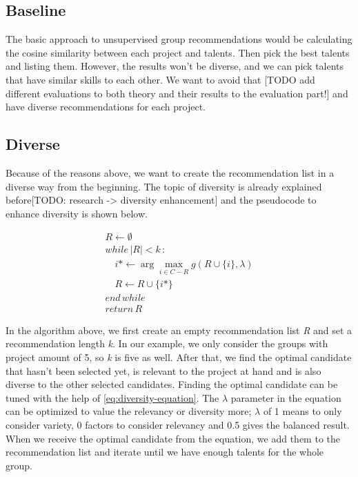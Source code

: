\subsection{Baseline}

The basic approach to unsupervised group recommendations would be calculating the cosine similarity between each project and talents. Then pick the best talents and listing them. However, the results won't be diverse, and we can pick talents that have similar skills to each other. We want to avoid that [TODO add different evaluations to both theory and their results to the evaluation part!] and have diverse recommendations for each project.


\subsection{Diverse}\label{implementation-diverse}

Because of the reasons above, we want to create the recommendation list in a diverse way from the beginning. The topic of diversity is already explained before[TODO: research -> diversity enhancement] and the pseudocode to enhance diversity is shown below.

\begin{equation}
\begin{array} { l } { R \leftarrow \emptyset } \\ {  while\, | R | < k\,: } \\ { \quad i * \leftarrow \arg \max _ { i \in C - R } g ( R \cup \{ i \} , \lambda ) } \\ { \quad R \leftarrow R \cup \{ i * \} } \\ { end\, while\,  } \\ {  return\,  R } \end{array}
\label{eq:diversity-enhancement}
\end{equation}


In the algorithm above, we first create an empty recommendation list \textit{R} and set a recommendation length \textit{k}. In our example, we only consider the groups with project amount of 5, so \textit{k} is five as well. After that, we find the optimal candidate that hasn't been selected yet, is relevant to the project at hand and is also diverse to the other selected candidates. Finding the optimal candidate can be tuned with the help of \autoref{eq:diversity-equation}. The $\lambda$ parameter in the equation can be optimized to value the relevancy or diversity more; $\lambda$ of 1 means to only consider variety, 0 factors to consider relevancy and 0.5 gives the balanced result. When we receive the optimal candidate from the equation, we add them to the recommendation list and iterate until we have enough talents for the whole group.

